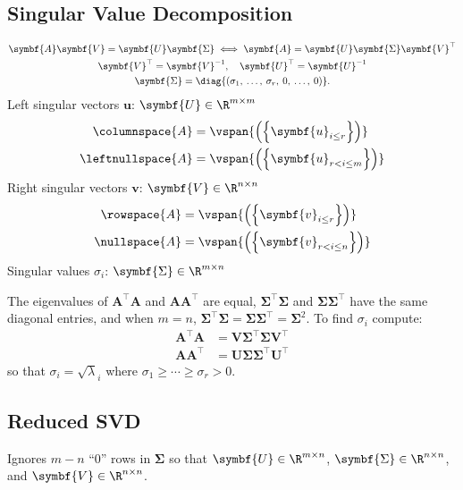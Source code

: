 \documentclass{article}
\begin{document}
\begin{multicols*}{3}
    \section{Singular Value Decomposition}
    \begin{gather*}
        \symbf{A} \symbf{V} = \symbf{U} \symbf{\Sigma}
        \iff
        \symbf{A} = \symbf{U} \symbf{\Sigma} \symbf{V}^\top                                        \\
        \symbf{V}^\top = \symbf{V}^{-1}, \quad \symbf{U}^\top = \symbf{U}^{-1}                                                          \\
        \symbf{\Sigma} = \diag{\left( \sigma_1,\: \dots,\: \sigma_r,\: 0,\: \dots,\: 0 \right)}.
    \end{gather*}
    Left singular vectors \(\symbf{u}\): \(\symbf{U} \in \R^{m \times m}\)
    \begin{align*}
        \columnspace{A}   & = \vspan{\left( \left\{ \symbf{u}_{i \leq r} \right\} \right)}     \\
        \leftnullspace{A} & = \vspan{\left( \left\{ \symbf{u}_{r < i \leq m} \right\} \right)}
    \end{align*}
    Right singular vectors \(\symbf{v}\): \(\symbf{V} \in  \R^{n \times n}\)
    \begin{align*}
        \rowspace{A}  & = \vspan{\left( \left\{ \symbf{v}_{i \leq r} \right\} \right)}     \\
        \nullspace{A} & = \vspan{\left( \left\{ \symbf{v}_{r < i \leq n} \right\} \right)}
    \end{align*}
    Singular values \(\sigma_i\): \(\symbf{\Sigma} \in \R^{m \times n}\)

    The eigenvalues of \(\symbf{A}^\top\symbf{A}\) and
    \(\symbf{A}\symbf{A}^\top\) are equal, \(\symbf{\Sigma}^\top
    \symbf{\Sigma}\) and \(\symbf{\Sigma} \symbf{\Sigma}^\top\) have
    the same diagonal entries, and when \(m = n\),
    \(\symbf{\Sigma}^\top\symbf{\Sigma} = \symbf{\Sigma}
    \symbf{\Sigma}^\top = \symbf{\Sigma}^2\). To find \(\sigma_i\)
    compute:
    \begin{align*}
        \symbf{A}^\top \symbf{A} & = \symbf{V} \symbf{\Sigma}^\top \symbf{\Sigma} \symbf{V}^\top \\
        \symbf{A} \symbf{A}^\top & = \symbf{U} \symbf{\Sigma} \symbf{\Sigma}^\top \symbf{U}^\top
    \end{align*}
    so that \(\sigma_i = \sqrt{\lambda}_i\) where \(\sigma_1 \geq \cdots \geq \sigma_r > 0\).
    \subsection{Reduced SVD}
    Ignores \(m - n\) ``0'' rows in \(\symbf{\Sigma}\) so that
    \(\symbf{U} \in \R^{m \times n}\), \(\symbf{\Sigma} \in \R^{n
    \times n}\), and \(\symbf{V} \in \R^{n \times n}\).

\end{multicols*}
\end{document}
